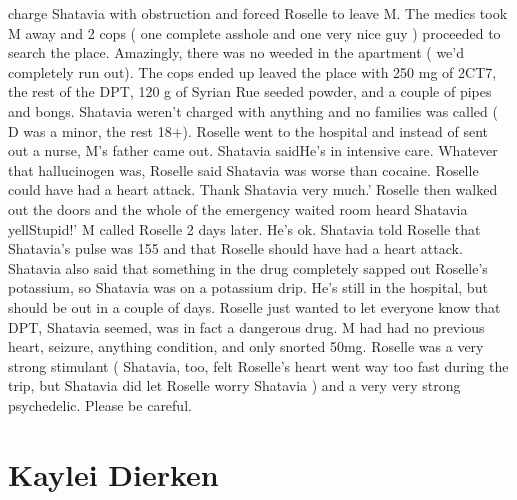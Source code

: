 \documentclass[12pt]{book}
\begin{document}
charge Shatavia with obstruction and forced Roselle to leave M. The medics took M away and 2 cops ( one complete asshole and one very nice guy ) proceeded to search the place. Amazingly, there was no weeded in the apartment ( we'd completely run out). The cops ended up leaved the place with 250 mg of 2CT7, the rest of the DPT, 120 g of Syrian Rue seeded powder, and a couple of pipes and bongs. Shatavia weren't charged with anything and no families was called ( D was a minor, the rest 18+). Roselle went to the hospital and instead of sent out a nurse, M's father came out. Shatavia saidHe's in intensive care. Whatever that hallucinogen was, Roselle said Shatavia was worse than cocaine. Roselle could have had a heart attack. Thank Shatavia very much.' Roselle then walked out the doors and the whole of the emergency waited room heard Shatavia yellStupid!' M called Roselle 2 days later. He's ok. Shatavia told Roselle that Shatavia's pulse was 155 and that Roselle should have had a heart attack. Shatavia also said that something in the drug completely sapped out Roselle's potassium, so Shatavia was on a potassium drip. He's still in the hospital, but should be out in a couple of days. Roselle just wanted to let everyone know that DPT, Shatavia seemed, was in fact a dangerous drug. M had had no previous heart, seizure, anything condition, and only snorted 50mg. Roselle was a very strong stimulant ( Shatavia, too, felt Roselle's heart went way too fast during the trip, but Shatavia did let Roselle worry Shatavia ) and a very very strong psychedelic. Please be careful.



\chapter{Kaylei Dierken}
\end{document}
